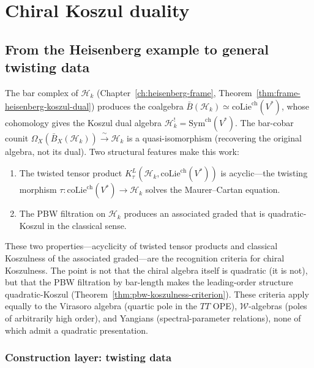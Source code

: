 \chapter{Chiral Koszul duality}
\label{chap:koszul-pairs}



\section{From the Heisenberg example to general twisting data}

The bar complex of $\mathcal{H}_k$ (Chapter~\ref{ch:heisenberg-frame},
Theorem~\ref{thm:frame-heisenberg-koszul-dual})
produces the coalgebra $\bar{B}(\mathcal{H}_k)
\simeq \mathrm{coLie}^{\mathrm{ch}}(V^*)$,
whose cohomology gives the Koszul dual algebra
$\mathcal{H}_k^! = \mathrm{Sym}^{\mathrm{ch}}(V^*)$.
The bar-cobar counit
$\Omega_X(\bar{B}_X(\mathcal{H}_k)) \xrightarrow{\;\sim\;} \mathcal{H}_k$
is a quasi-isomorphism (recovering the original algebra, not its dual).  Two structural features make this work:

\begin{enumerate}
\item The twisted tensor product
  $K_\tau^L(\mathcal{H}_k, \mathrm{coLie}^{\mathrm{ch}}(V^*))$
  is acyclic---the twisting morphism
  $\tau\colon \mathrm{coLie}^{\mathrm{ch}}(V^*) \to \mathcal{H}_k$
  solves the Maurer--Cartan equation.
\item The PBW filtration on $\mathcal{H}_k$ produces an
  associated graded that is quadratic-Koszul in the classical sense.
\end{enumerate}

These two properties---acyclicity of twisted tensor products and
classical Koszulness of the associated graded---are the
recognition criteria for chiral Koszulness.  The point is not that
the chiral algebra itself is quadratic (it is not), but that the PBW
filtration by bar-length makes the leading-order structure
quadratic-Koszul (Theorem~\ref{thm:pbw-koszulness-criterion}).
These criteria apply equally to
the Virasoro algebra (quartic pole in the $TT$ OPE),
$\mathcal{W}$-algebras (poles of arbitrarily high order),
and Yangians (spectral-parameter relations), none of which
admit a quadratic presentation.

\label{rem:chiral-koszul-pairs-hms}%

\subsection{Construction layer: twisting data}

